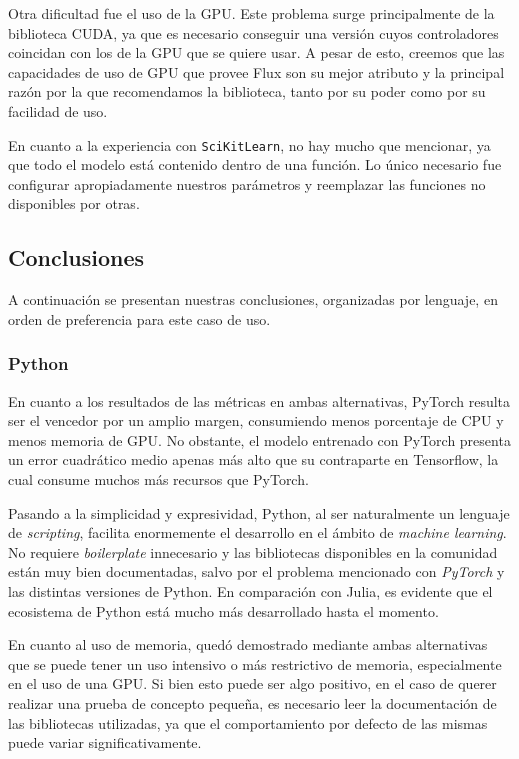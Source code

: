 \documentclass[11pt]{article}
\let\Oldsubsection\subsection
\renewcommand{\subsection}{\FloatBarrier\Oldsubsection}
\let\Oldsubsubsection\subsubsection
\renewcommand{\subsubsection}{\FloatBarrier\Oldsubsubsection}
\newcommand{\english}[1]{\textit{#1}}
\begin{document}
Otra dificultad fue el uso de la GPU. Este problema surge principalmente de la biblioteca CUDA, ya que es necesario conseguir una versión cuyos controladores coincidan con los de la GPU que se quiere usar. A pesar de esto, creemos que las capacidades de uso de GPU que provee Flux son su mejor atributo y la principal razón por la que recomendamos la biblioteca, tanto por su poder como por su facilidad de uso.

En cuanto a la experiencia con \lstinline{SciKitLearn}, no hay mucho que mencionar, ya que todo el modelo está contenido dentro de una función. Lo único necesario fue configurar apropiadamente nuestros parámetros y reemplazar las funciones no disponibles por otras.

\subsection{Conclusiones}

A continuación se presentan nuestras conclusiones, organizadas por lenguaje, en orden de preferencia para este caso de uso.

\subsubsection{Python}

En cuanto a los resultados de las métricas en ambas alternativas, PyTorch resulta ser el vencedor por un amplio margen, consumiendo menos porcentaje de CPU y menos memoria de GPU. No obstante, el modelo entrenado con PyTorch presenta un error cuadrático medio apenas más alto que su contraparte en Tensorflow, la cual consume muchos más recursos que PyTorch.

Pasando a la simplicidad y expresividad, Python, al ser naturalmente un lenguaje de \english{scripting}, facilita enormemente el desarrollo en el ámbito de \english{machine learning}. No requiere \textit{boilerplate} innecesario y las bibliotecas disponibles en la comunidad están muy bien documentadas, salvo por el problema mencionado con \textit{PyTorch} y las distintas versiones de Python. En comparación con Julia, es evidente que el ecosistema de Python está mucho más desarrollado hasta el momento.

En cuanto al uso de memoria, quedó demostrado mediante ambas alternativas que se puede tener un uso intensivo o más restrictivo de memoria, especialmente en el uso de una GPU. Si bien esto puede ser algo positivo, en el caso de querer realizar una prueba de concepto pequeña, es necesario leer la documentación de las bibliotecas utilizadas, ya que el comportamiento por defecto de las mismas puede variar significativamente.
\end{document}
